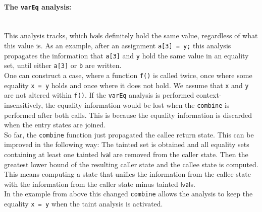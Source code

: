       \paragraph{The \texttt{varEq} analysis:}\mbox{}\\
        This analysis tracks, which $\textsf{lval}$s definitely hold the same value, regardless of what this value is. As an example, after an assignment \texttt{a[3] = y;} this analysis propagates the information that \texttt{a[3]} and \texttt{y} hold the same value in an equality set, until either \texttt{a[3]} or \texttt{b} are written.\\
        One can construct a case, where a function \texttt{f()} is called twice, once where some equality \texttt{x = y} holds and once where it does not hold. We assume that \texttt{x} and \texttt{y} are not altered within \texttt{f()}. If the \texttt{varEq} analysis is performed context-insensitively, the equality information would be lost when the \texttt{combine} is performed after both calls. This is because the equality information is discarded when the entry states are joined.\\
        So far, the \texttt{combine} function just propagated the callee return state. This can be improved in the following way: The tainted set is obtained and all equality sets containing at least one tainted $\textsf{lval}$ are removed from the caller state. Then the greatest lower bound of the resulting caller state and the callee state is computed. This means computing a state that unifies the information from the callee state with the information from the caller state minus tainted $\textsf{lval}$s.\\
        In the example from above this changed \texttt{combine} allows the analysis to keep the equality \texttt{x = y} when the taint analysis is activated.\\
        \\
